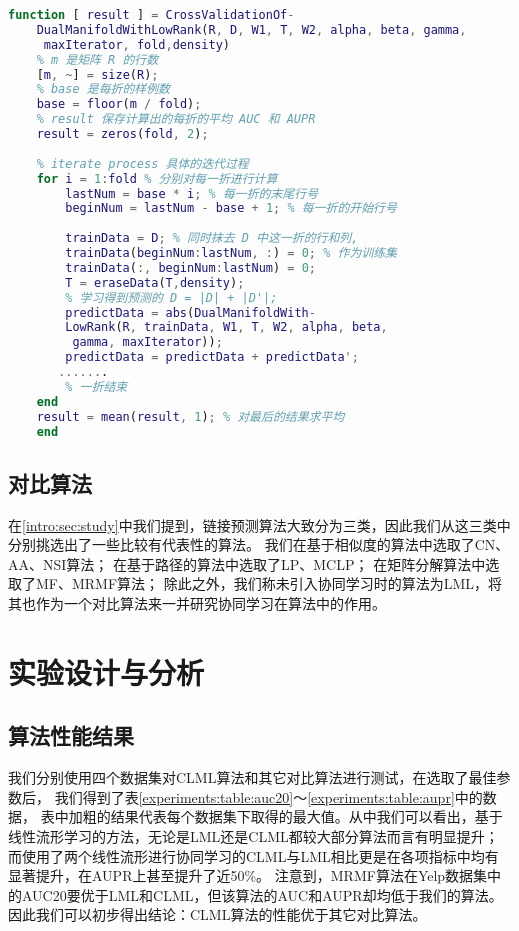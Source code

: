 \begin{lstlisting}[caption={交叉验证的关键代码},language=Matlab]
    function [ result ] = CrossValidationOf-
    DualManifoldWithLowRank(R, D, W1, T, W2, alpha, beta, gamma,
     maxIterator, fold,density)
    % m 是矩阵 R 的行数
    [m, ~] = size(R); 
    % base 是每折的样例数
    base = floor(m / fold); 
    % result 保存计算出的每折的平均 AUC 和 AUPR
    result = zeros(fold, 2); 
    
    % iterate process 具体的迭代过程
    for i = 1:fold % 分别对每一折进行计算
        lastNum = base * i; % 每一折的末尾行号
        beginNum = lastNum - base + 1; % 每一折的开始行号
        
        trainData = D; % 同时抹去 D 中这一折的行和列,
        trainData(beginNum:lastNum, :) = 0; % 作为训练集
        trainData(:, beginNum:lastNum) = 0;       
        T = eraseData(T,density);
        % 学习得到预测的 D = |D| + |D'|;
        predictData = abs(DualManifoldWith-
        LowRank(R, trainData, W1, T, W2, alpha, beta,
         gamma, maxIterator));
        predictData = predictData + predictData';
       .......
        % 一折结束
    end
    result = mean(result, 1); % 对最后的结果求平均
    end
\end{lstlisting}

\subsection{对比算法}
在\ref{intro:sec:study}中我们提到，链接预测算法大致分为三类，因此我们从这三类中分别挑选出了一些比较有代表性的算法。
我们在基于相似度的算法中选取了CN、AA、NSI算法；
在基于路径的算法中选取了LP、MCLP；
在矩阵分解算法中选取了MF、MRMF算法；
除此之外，我们称未引入协同学习时的算法为LML，将其也作为一个对比算法来一并研究协同学习在算法中的作用。

\section{实验设计与分析}
\subsection{算法性能结果}
我们分别使用四个数据集对CLML算法和其它对比算法进行测试，在选取了最佳参数后，
我们得到了表\ref{experiments:table:auc20}～\ref{experiments:table:aupr}中的数据，
表中加粗的结果代表每个数据集下取得的最大值。从中我们可以看出，基于线性流形学习的方法，无论是LML还是CLML都较大部分算法而言有明显提升；
而使用了两个线性流形进行协同学习的CLML与LML相比更是在各项指标中均有显著提升，在AUPR上甚至提升了近50\%。
注意到，MRMF算法在Yelp数据集中的AUC20要优于LML和CLML，但该算法的AUC和AUPR却均低于我们的算法。
因此我们可以初步得出结论：CLML算法的性能优于其它对比算法。


